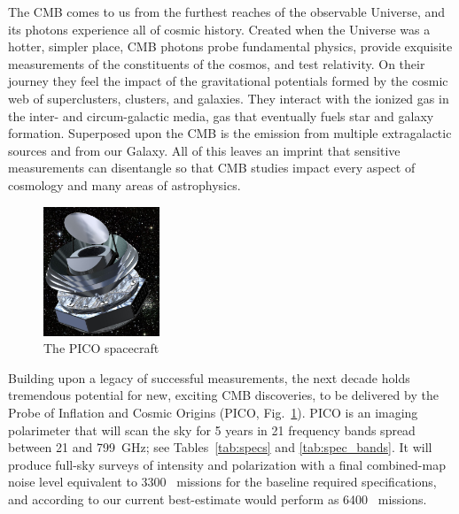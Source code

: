 \documentclass[PICOReport.tex]{subfiles}
\begin{document}

The \ac{CMB} comes to us from the furthest reaches of the observable Universe, and its photons experience all of cosmic history.  Created when the Universe was a hotter, simpler place, CMB photons probe fundamental physics, provide exquisite measurements of the constituents of the cosmos, and test relativity.  On their journey they feel the impact of the gravitational potentials formed by the cosmic web of superclusters, clusters, and galaxies.  They interact with the ionized gas in the inter- and circum-galactic media, gas that eventually fuels star and galaxy formation.  Superposed upon the CMB is the emission from multiple extragalactic sources and from our Galaxy.  All of this leaves an imprint that sensitive measurements can disentangle so that CMB studies impact every aspect of cosmology and many areas of astrophysics.

\begin{figure}  %
\vspace{-5pt} %
\includegraphics[width=0.31\textwidth]{images/PICO_Image.jpg}
\vspace{-0.25in}
\caption{\captiontext The PICO spacecraft 
\label{fig:pico_rendered} }
\end{figure}

Building upon a legacy of successful measurements, the next decade holds tremendous potential for new, exciting \ac{CMB} discoveries, to be delivered by the Probe of Inflation and Cosmic Origins (PICO, Fig.~\ref{fig:pico_rendered}). PICO is an imaging polarimeter that will scan the sky for 5 years in 21 frequency bands spread between 21 and 799~GHz; see Tables~\ref{tab:specs} and \ref{tab:spec_bands}. It will produce %
full-sky surveys of intensity and polarization with a final combined-map noise level equivalent to 3300 \planck\ missions for the baseline required specifications, and according to our current best-estimate would perform as 6400 \planck\ missions.  
\end{document}
